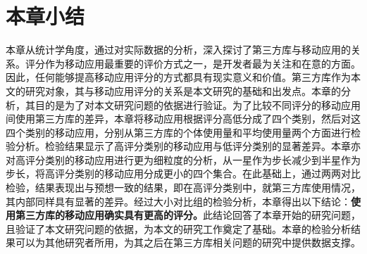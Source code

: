 \section{本章小结}
本章从统计学角度，通过对实际数据的分析，深入探讨了第三方库与移动应用的关系。评分作为移动应用最重要的评价方式之一，是开发者最为关注和在意的方面。因此，任何能够提高移动应用评分的方式都具有现实意义和价值。第三方库作为本文的研究对象，其与移动应用评分的关系是本文研究的基础和出发点。本章的分析，其目的是为了对本文研究问题的依据进行验证。为了比较不同评分的移动应用间使用第三方库的差异，本章将移动应用根据评分高低分成了四个类别，然后对这四个类别的移动应用，分别从第三方库的个体使用量和平均使用量两个方面进行检验分析。检验结果显示了高评分类别的移动应用与低评分类别的显著差异。本章亦对高评分类别的移动应用进行更为细粒度的分析，从一星作为步长减少到半星作为步长，将高评分类别的移动应用分成更小的四个集合。在此基础上，通过两两对比检验，结果表现出与预想一致的结果，即在高评分类别中，就第三方库使用情况，其内部同样具有显著的差异。经过大小对比组的检验分析，本章得出以下结论：\textbf{使用第三方库的移动应用确实具有更高的评分。}此结论回答了本章开始的研究问题，且验证了本文研究问题的依据，为本文的研究工作奠定了基础。本章的检验分析结果可以为其他研究者所用，为其之后在第三方库相关问题的研究中提供数据支撑。

